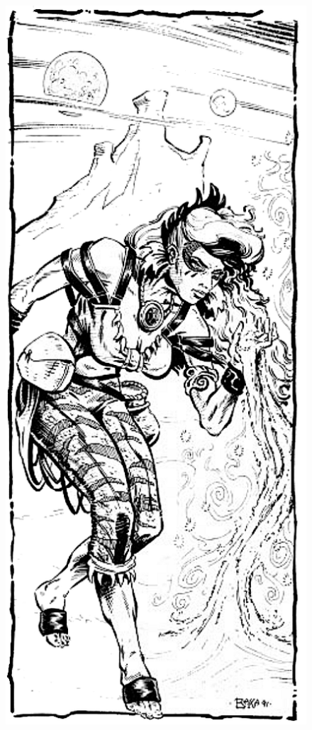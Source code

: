 \begin{figure}[t!]
\centering
\includegraphics[width=\columnwidth]{images/wizard-2.png}
\WOTC
\end{figure}


